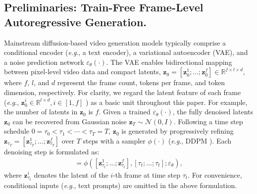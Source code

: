 \documentclass{article}
\theoremstyle{plain}
\theoremstyle{definition}
\theoremstyle{remark}
\newcommand{\eg}{\textit{e}.\textit{g}.}
\begin{document}
\subsection{Preliminaries: Train-Free Frame-Level Autoregressive Generation.}
\label{sec_3_1}
Mainstream diffusion-based video generation models typically comprise a conditional encoder (\eg, a text encoder), a variational autoencoder (VAE), and a noise prediction network $\varepsilon_\theta(\cdot)$. 
The VAE enables bidirectional mapping between pixel-level video data and compact latents, $\mathbf{z}_0 = [\mathbf{z}_0^1; ...; \mathbf{z}_0^f] \in \mathbb{R}^{f \times l \times d}$, where $f$, $l$, and $d$ represent the frame count, tokens per frame, and token dimension, respectively.
For clarity, we regard the latent feature of each frame (\eg, $\mathbf{z}_0^i \in \mathbb{R}^{l \times d}, i \in [1,f]$ ) as a basic unit throughout this paper. For example, the  number of latents in $\mathbf{z}_0$ is $f$.
Given a trained $\varepsilon_\theta(\cdot)$, the fully denoised latents $\mathbf{z}_0$ can be recovered from Gaussian noise $\mathbf{z}_T \sim \mathcal{N}(0, I)$. 
Following a time step schedule $0 = \tau_0 < \tau_1 < \cdots < \tau_T = T$, $\mathbf{z}_0$ is generated by progressively refining $\mathbf{z}_{\tau_T} = [\mathbf{z}_{\tau_T}^1; \ldots; \mathbf{z}_{\tau_T}^f]$ over $T$ steps with a sampler $\phi(\cdot)$ (\eg, DDPM \cite{ho2020denoising}).
Each denoising step is formulated as:
\begin{align}
  [\mathbf{z}_{\tau_{t-1}}^1; \ldots; \mathbf{z}_{\tau_{t-1}}^f] = \phi([\mathbf{z}_{\tau_t}^1; \ldots; \mathbf{z}_{\tau_t}^f], [\tau_t; \ldots; \tau_t]; \varepsilon_\theta),
  \label{eq:fifo}
\end{align}
where $\mathbf{z}_{\tau_t}^i$ denotes the latent of the $i$-th frame at time step $\tau_t$. For convenience, conditional inputs (\eg, text prompts) are omitted in the above formulation.
\end{document}
